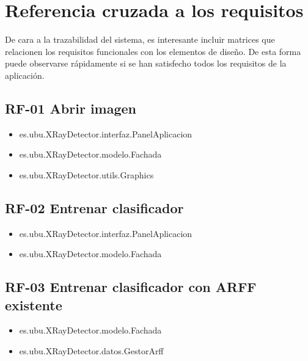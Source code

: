 


\section{Referencia cruzada a los requisitos}
De cara a la trazabilidad del sistema, es interesante incluir matrices que relacionen los requisitos funcionales con los elementos de diseño. De esta forma puede observarse rápidamente si se han satisfecho todos los requisitos de la aplicación.

\subsection{RF-01 Abrir imagen}
\begin{itemize}
\item[] es.ubu.XRayDetector.interfaz.PanelAplicacion
\item[] es.ubu.XRayDetector.modelo.Fachada
\item[] es.ubu.XRayDetector.utils.Graphics
\end{itemize}

\subsection{RF-02 Entrenar clasificador}
\begin{itemize}
\item[] es.ubu.XRayDetector.interfaz.PanelAplicacion
\item[] es.ubu.XRayDetector.modelo.Fachada
\end{itemize}

\subsection{RF-03 Entrenar clasificador con ARFF existente}
\begin{itemize}
\item[] es.ubu.XRayDetector.modelo.Fachada
\item[] es.ubu.XRayDetector.datos.GestorArff
\end{itemize}

